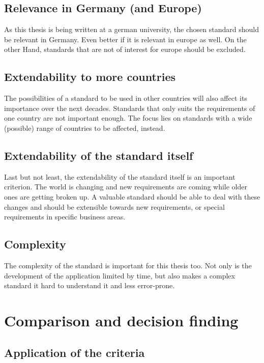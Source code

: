 \documentclass[english,mt]{lmedoc}
\begin{document}
\subsection{Relevance in Germany (and Europe)}
\label{sec2.2.2}
As this thesis is being written at a german university, the chosen standard should be relevant in Germany. Even better if it is relevant in europe as well. On the other Hand, standards that are not of interest for europe should be excluded.

\subsection{Extendability to more countries}
\label{sec2.2.3}
The possibilities of a standard to be used in other countries will also affect its importance over the next decades. Standards that only suits the requirements of one country are not important enough. The focus lies on standards with a wide (possible) range of countries to be affected, instead.

\subsection{Extendability of the standard itself}
\label{sec2.2.4}
Last but not least, the extendability of the standard itself is an important criterion. The world is changing and new requirements are coming while older ones are getting broken up. A valuable standard should be able to deal with these changes and should be extensible towards new requirements, or special requirements in specific business areas.

\subsection{Complexity}
\label{sec2.2.5}
The complexity of the standard is important for this thesis too. Not only is the development of the application limited by time, but also makes a complex standard it hard to understand it and less error-prone.

\section{Comparison and decision finding}
\label{sec2.3}

\subsection{Application of the criteria}
\label{sec2.3.1}
\end{document}
